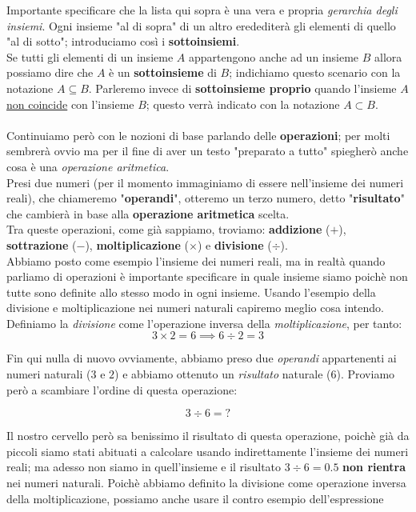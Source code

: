 Importante specificare che la lista qui sopra è una vera e propria \emph{gerarchia degli insiemi}.
Ogni insieme "al di sopra" di un altro eredediterà gli elementi di quello "al di sotto";
introduciamo così i \textbf{sottoinsiemi}. \\
Se tutti gli elementi di un insieme \(A\) appartengono anche ad un insieme \(B\) allora
possiamo dire che \(A\) è un \textbf{sottoinsieme} di \(B\); indichiamo questo scenario
con la notazione \(A \subseteq B\). Parleremo invece di \textbf{sottoinsieme proprio}
quando l'insieme \(A\) \underline{non coincide} con l'insieme \(B\); questo verrà indicato
con la notazione \(A \subset B\).
\\
\\
Continuiamo però con le nozioni di base parlando delle \textbf{operazioni}; 
per molti sembrerà ovvio ma per il fine di aver un testo "preparato a tutto" spiegherò anche
cosa è una \emph{operazione aritmetica}. \\
Presi due numeri (per il momento immaginiamo di essere nell'insieme dei numeri reali),
che chiameremo "\textbf{operandi}", otteremo un terzo numero, detto "\textbf{risultato}" che
cambierà in base alla \textbf{operazione aritmetica} scelta. \\
Tra queste operazioni, come già sappiamo, troviamo: \textbf{addizione} (\(+\)), 
\textbf{sottrazione} (\(-\)), \textbf{moltiplicazione} (\(\times\))
e \textbf{divisione} (\(\div\)). \\
Abbiamo posto come esempio l'insieme dei numeri reali, ma in realtà quando parliamo di operazioni
è importante specificare in quale insieme siamo poichè non tutte sono definite allo stesso
modo in ogni insieme.
Usando l'esempio della divisione e moltiplicazione nei numeri naturali capiremo meglio cosa intendo.
\\
Definiamo la \emph{divisione} come l'operazione inversa della \emph{moltiplicazione}, per tanto:
\[ 3 \times 2 = 6 \implies 6 \div 2 = 3 \]

Fin qui nulla di nuovo ovviamente, abbiamo preso due \emph{operandi} appartenenti ai numeri naturali
(\(3\) e \(2\)) e abbiamo ottenuto un \emph{risultato} naturale (\(6\)). Proviamo però a scambiare
l'ordine di questa operazione:

\[ 3 \div 6 = ? \]

Il nostro cervello però sa benissimo il risultato di questa operazione, poichè già da piccoli siamo
stati abituati a calcolare usando indirettamente l'insieme dei numeri reali; ma adesso non siamo
in quell'insieme e il risultato \(3 \div 6 = 0.5\) \textbf{non rientra} nei numeri naturali.
Poichè abbiamo definito la divisione come operazione inversa della moltiplicazione, possiamo anche
usare il contro esempio dell'espressione

